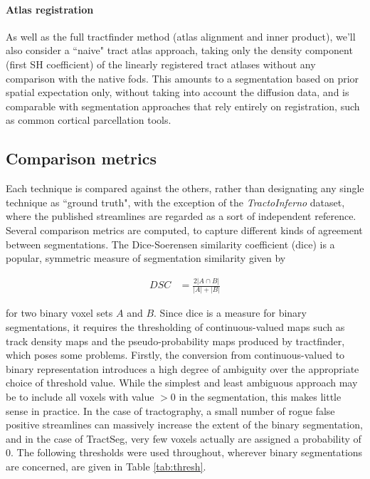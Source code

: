 \paragraph*{Atlas registration}

As well as the full tractfinder method (atlas alignment and inner product), we'll also consider a ``naive" tract atlas approach, taking only the density component (first SH coefficient) of the linearly registered tract atlases without any comparison with the native \glspl{fod}.
This amounts to a segmentation based on prior spatial expectation only, without taking into account the diffusion data, and is comparable with segmentation approaches that rely entirely on registration, such as common cortical parcellation tools.

\subsection{Comparison metrics}

Each technique is compared against the others, rather than designating any single technique as ``ground truth", with the exception of the \textit{TractoInferno} dataset, where the published streamlines are regarded as a sort of independent reference.
Several comparison metrics are computed, to capture different kinds of agreement between segmentations.
The Dice-Soerensen similarity coefficient (\gls{dice}) \autocite{Dice1945} is a popular, symmetric measure of segmentation similarity given by

\begin{align}
  DSC &= \frac{2 |A \cap B|}{|A| + |B|}
\end{align}

for two binary voxel sets $A$ and $B$.
Since \gls{dice} is a measure for binary segmentations, it requires the thresholding of continuous-valued maps such as track density maps and the pseudo-probability maps produced by tractfinder, which poses some problems.
Firstly, the conversion from continuous-valued to binary representation introduces a high degree of ambiguity over the appropriate choice of threshold value.
While the simplest and least ambiguous approach may be to include all voxels with value $>0$ in the segmentation, this makes little sense in practice.
In the case of tractography, a small number of rogue false positive streamlines can massively increase the extent of the binary segmentation, and in the case of TractSeg, very few voxels actually are assigned a probability of 0.
The following thresholds were used throughout, wherever binary segmentations are concerned, are given in Table \ref{tab:thresh}.

